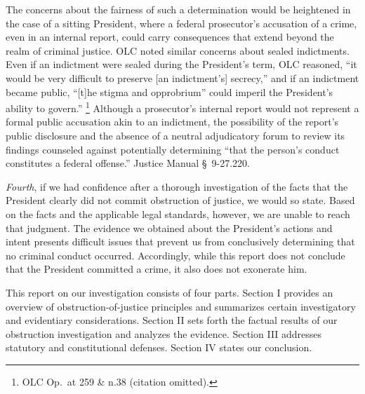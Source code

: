 The concerns about the fairness of such a determination would be heightened in the case of a sitting President, where a federal prosecutor's accusation of a crime, even in an internal report, could carry consequences that extend beyond the realm of criminal justice.
OLC noted similar concerns about sealed indictments.
Even if an indictment were sealed during the President's term, OLC reasoned, ``it would be very difficult to preserve [an indictment's] secrecy,'' and if an indictment became public, ``[t]he stigma and opprobrium'' could imperil the President's ability to govern.''%
\footnote{OLC Op.\ at 259 \& n.38 (citation omitted).}
Although a prosecutor's internal report would not represent a formal public accusation akin to an indictment, the possibility of the report's public disclosure and the absence of a neutral adjudicatory forum to review its findings counseled against potentially determining ``that the person's conduct constitutes a federal offense.''
Justice Manual \S~9-27.220.

\textit{Fourth}, if we had confidence after a thorough investigation of the facts that the President clearly did not commit obstruction of justice, we would so state.
Based on the facts and the applicable legal standards, however, we are unable to reach that judgment.
The evidence we obtained about the President's actions and intent presents difficult issues that prevent us from
conclusively determining that no criminal conduct occurred.
Accordingly, while this report does not conclude that the President committed a crime, it also does not exonerate him.

\hr

This report on our investigation consists of four parts.
Section I provides an overview of obstruction-of-justice principles and summarizes certain investigatory and evidentiary considerations.
Section II sets forth the factual results of our obstruction investigation and analyzes the evidence.
Section III addresses statutory and constitutional defenses.
Section IV states our conclusion.
